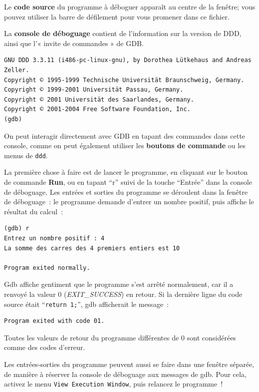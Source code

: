 \documentclass[12pt,a4paper]{article}
\begin{document}
Le {\bf code source} du programme à déboguer apparaît au centre de la
fenêtre; vous pouvez utiliser la barre de défilement pour vous
promener dans ce fichier.

\bigskip

La {\bf console de déboguage} contient de l'information sur la version
de DDD, ainsi que l’« invite de commandes » de GDB. 
\begin{verbatim}
GNU DDD 3.3.11 (i486-pc-linux-gnu), by Dorothea Lütkehaus and Andreas Zeller.
Copyright © 1995-1999 Technische Universität Braunschweig, Germany.
Copyright © 1999-2001 Universität Passau, Germany.
Copyright © 2001 Universität des Saarlandes, Germany.
Copyright © 2001-2004 Free Software Foundation, Inc.
(gdb)
\end{verbatim}
On peut
interagir directement avec GDB en tapant des commandes dans cette
console, comme on peut également utiliser les {\bf boutons de
  commande} ou les menus de {\tt ddd}.


\bigskip



La première chose à faire est de lancer le programme, en cliquant sur
le bouton de commande {\bf Run}, ou en tapant ``r'' suivi de la
touche ``Entrée'' dans la console de déboguage. Les entrées et sorties
du programme se déroulent dans la fenêtre de déboguage~: le programme
demande d'entrer un nombre positif, puis affiche le résultat du
calcul~:

\begin{verbatim}
(gdb) r
Entrez un nombre positif : 4
La somme des carres des 4 premiers entiers est 10

Program exited normally.
\end{verbatim}

Gdb affiche gentiment que le programme s'est arrêté normalement,
car il a renvoyé la valeur $0$ (\textit{EXIT\_SUCCESS}) en retour. Si
la dernière ligne du code
source était ``{\tt return 1;}'', gdb afficherait le message~:

\begin{verbatim}
Program exited with code 01.
\end{verbatim}

Toutes les valeurs de retour du programme différentes de 0 sont
considérées comme des codes d'erreur.

\bigskip

Les entrées-sorties du programme peuvent aussi se faire dans une
fenêtre séparée, de manière à réserver la console de déboguage aux
messages de gdb. Pour cela, activez le menu {\tt View \puis Execution
  Window}, puis relancez le programme~!
\end{document}
